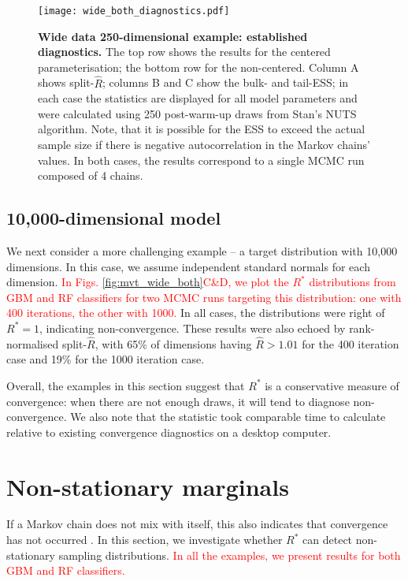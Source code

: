 \documentclass{article}
\begin{document}
\begin{figure}[!htb]
	\centerline{\texttt{[image: wide\_both\_diagnostics.pdf]}}
	\caption{\textbf{Wide data 250-dimensional example: established diagnostics.} The top row shows the results for the centered parameterisation; the bottom row for the non-centered. Column A shows split-$\widehat{R}$; columns B and C show the bulk- and tail-ESS; in each case the statistics are displayed for all model parameters and were calculated using 250 post-warm-up draws from Stan's NUTS algorithm. Note, that it is possible for the ESS to exceed the actual sample size if there is negative autocorrelation in the Markov chains' values. In both cases, the results correspond to a single MCMC run composed of 4 chains.}
	\label{fig:wide_both_diagnostics}
\end{figure}

\subsection{10,000-dimensional model}
We next consider a more challenging example -- a target distribution with 10,000 dimensions. In this case, we assume independent standard normals for each dimension. \textcolor{red}{In Figs. \ref{fig:mvt_wide_both}C\&D, we plot the $R^*$ distributions from GBM and RF classifiers for two MCMC runs targeting this distribution: one with 400 iterations, the other with 1000.} In all cases, the distributions were right of $R^*=1$, indicating non-convergence. These results were also echoed by rank-normalised split-$\widehat{R}$, with 65\% of dimensions having $\widehat{R}>1.01$ for the 400 iteration case and 19\% for the 1000 iteration case.

Overall, the examples in this section suggest that $R^*$ is a conservative measure of convergence: when there are not enough draws, it will tend to diagnose non-convergence. We also note that the statistic took comparable time to calculate relative to existing convergence diagnostics on a desktop computer.

\section{Non-stationary marginals}\label{sec:non-stationary}
If a Markov chain does not mix with itself, this also indicates that convergence has not occurred \citep{gelman2013bayesian}. In this section, we investigate whether $R^*$ can detect non-stationary sampling distributions. \textcolor{red}{In all the examples, we present results for both GBM and RF classifiers.}
\end{document}
